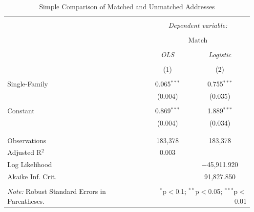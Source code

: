 \documentclass[11pt]{article}
\begin{document}
\begin{table}[!htbp] \centering 
  \caption{Simple Comparison of Matched and Unmatched Addresses} 
  \label{tab:geocode_match_biv} 
\begin{tabular}{@{\extracolsep{5pt}}lcc} 
\\[-1.8ex]\hline 
\hline \\[-1.8ex] 
 & \multicolumn{2}{c}{\textit{Dependent variable:}} \\ 
\cline{2-3} 
\\[-1.8ex] & \multicolumn{2}{c}{Match} \\ 
\\[-1.8ex] & \textit{OLS} & \textit{Logistic} \\ 
\\[-1.8ex] & (1) & (2)\\ 
\hline \\[-1.8ex] 
 Single-Family & 0.065$^{***}$ & 0.755$^{***}$ \\ 
  & (0.004) & (0.035) \\ 
  & & \\ 
 Constant & 0.869$^{***}$ & 1.889$^{***}$ \\ 
  & (0.004) & (0.034) \\ 
  & & \\ 
\hline \\[-1.8ex] 
Observations & 183,378 & 183,378 \\ 
Adjusted R$^{2}$ & 0.003 &  \\ 
Log Likelihood &  & $-$45,911.920 \\ 
Akaike Inf. Crit. &  & 91,827.850 \\ 
\hline 
\hline \\[-1.8ex] 
\textit{Note:} Robust Standard Errors in Parentheses. & \multicolumn{2}{r}{$^{*}$p$<$0.1; $^{**}$p$<$0.05; $^{***}$p$<$0.01} \\ 
\end{tabular} 
\end{table} 
\end{document}

